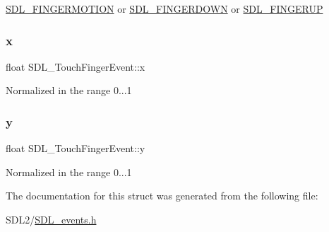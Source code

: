 \hyperlink{_s_d_l__events_8h_a3b589e89be6b35c02e0dd34a55f3fccaa1862d7d009ade2c79b2f1fe4a30c9dd2}{S\+D\+L\+\_\+\+F\+I\+N\+G\+E\+R\+M\+O\+T\+I\+ON} or \hyperlink{_s_d_l__events_8h_a3b589e89be6b35c02e0dd34a55f3fccaaa712d1fa8bb69f6042e24a31e835a9ec}{S\+D\+L\+\_\+\+F\+I\+N\+G\+E\+R\+D\+O\+WN} or \hyperlink{_s_d_l__events_8h_a3b589e89be6b35c02e0dd34a55f3fccaa8266a108a628cc698c5172e72c1fc1e6}{S\+D\+L\+\_\+\+F\+I\+N\+G\+E\+R\+UP} \mbox{\label{struct_s_d_l___touch_finger_event_a0ce44b1342220fa17e9b9b4a77c2c906}} 
\subsubsection{\texorpdfstring{x}{x}}
{\footnotesize\ttfamily float S\+D\+L\+\_\+\+Touch\+Finger\+Event\+::x}

Normalized in the range 0...1 \mbox{\label{struct_s_d_l___touch_finger_event_ac2bb8af638d2927a8e13f6ffe8f9384e}} 
\subsubsection{\texorpdfstring{y}{y}}
{\footnotesize\ttfamily float S\+D\+L\+\_\+\+Touch\+Finger\+Event\+::y}

Normalized in the range 0...1 

The documentation for this struct was generated from the following file\+:\begin{DoxyCompactItemize}
\item 
S\+D\+L2/\hyperlink{_s_d_l__events_8h}{S\+D\+L\+\_\+events.\+h}\end{DoxyCompactItemize}

